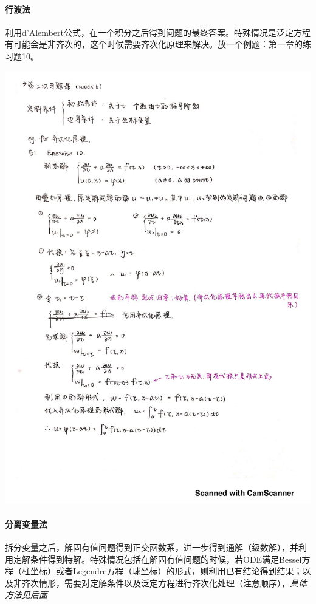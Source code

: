 \documentclass[]{report}
\begin{document}
		\paragraph{行波法}
		利用d'Alembert公式，在一个积分之后得到问题的最终答案。特殊情况是泛定方程有可能会是非齐次的，这个时候需要齐次化原理来解决。放一个例题：第一章的练习题10。\par
		\newpage
		\includegraphics[scale=0.7]{ref_files/部分知识点的参考/齐次化原理.pdf}
		\newpage
		\paragraph{分离变量法}
		拆分变量之后，解固有值问题得到正交函数系，进一步得到通解（级数解），并利用定解条件得到特解。特殊情况包括在解固有值问题的时候，若ODE满足Bessel方程（柱坐标）或者Legendre方程（球坐标）的形式，则利用已有结论得到结果；以及非齐次情形，需要对定解条件以及泛定方程进行齐次化处理（注意顺序），\textit{具体方法见后面}
\end{document}
